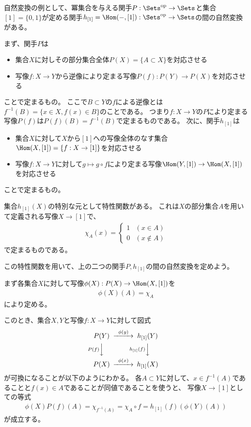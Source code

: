 \documentclass[uplatex]{jsarticle}
\begin{document}
\begin{eg}
自然変換の例として、冪集合を与える関手$P:\Sets^{\rm op} \to \Sets$と集合$[1]=\{0,1\}$が定める関手$h_{[1]}=\Hom(-,[1]):\Sets^{\rm op} \to \Sets$の間の自然変換がある。

まず、関手$P$は
\begin{itemize}
\item 集合$X$に対しその部分集合全体$P(X)=\{A \subset X\}$を対応させる
\item 写像$f:X \to Y$から逆像により定まる写像$P(f):P(Y) \to P(X)$を対応させる
\end{itemize}
ことで定まるもの。
ここで$B \subset Y$の$f$による逆像とは$f^{-1}(B)=\{x \in X, f(x)\in B\}$のことである。
つまり$f:X \to Y$の$P$により定まる写像$P(f)$は$P(f)(B)= f^{-1}(B)$で定まるものである。
次に、関手$h_{[1]}$は
\begin{itemize}
\item 集合$X$に対して$X$から$[1]$への写像全体のなす集合$\Hom(X,[1])=\{f:X \to [1]\}$を対応させる
\item 写像$f:X \to Y$に対して$g \mapsto g \circ f$により定まる写像$\Hom(Y,[1]) \to \Hom(X,[1])$を対応させる
\end{itemize}
ことで定まるもの。

集合$h_{[1]}(X)$の特別な元として特性関数がある。
これは$X$の部分集合$A$を用いて定義される写像$X \to [1]$で、
\begin{align*}
\chi_A(x)=\begin{cases}1 & (x\in A) \\ 0 & (x\notin A)\end{cases}
\end{align*}
で定まるものである。

この特性関数を用いて、上の二つの関手$P, h_{[1]}$の間の自然変換を定めよう。

まず各集合$X$に対して写像$\phi(X):P(X) \to \Hom(X,[1])$を
\begin{align*}
\phi(X)(A) = \chi_A
\end{align*}
により定める。

このとき、集合$X, Y$と写像$f:X \to Y$に対して図式
\[
\begin{CD}
P(Y)@>\phi(y)>>h_{[1]}(Y)\\
@VP(f)VV@Vh_{[1]}(f)VV\\
P(X)@>\phi(x)>>h_{[1]}(X)
\end{CD}
\]
が可換になることが以下のようにわかる。
各$A \subset Y$に対して、$x\in f^{-1}(A)$であることと$f(x)\in A$であることが同値であることを使うと、
写像$X \to [1]$としての等式
\begin{align*}
\phi(X)P(f)(A)=\chi_{f^{-1}(A)}=\chi_A\circ f=h_{[1]}(f)(\phi(Y)(A))
\end{align*}
が成立する。
\end{eg}
\end{document}
